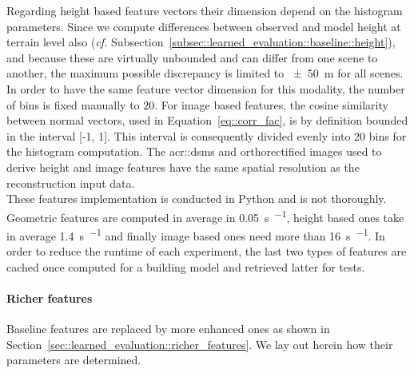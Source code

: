                 Regarding height based feature vectors their dimension depend on the histogram parameters.
                Since we compute differences between observed and model height at terrain level also (\textit{cf.} Subsection~\ref{subsec::learned_evaluation::baseline::height}), and because these are virtually unbounded and can differ from one scene to another, the maximum possible discrepancy is limited to \SI{\pm 50}{\m} for all scenes.
                In order to have the same feature vector dimension for this modality, the number of bins is fixed manually to \(20\).
                For image based features, the cosine similarity between normal vectors, used in Equation~\ref{eq::corr_fac}, is by definition bounded in the interval [-1, 1].
                This interval is consequently divided evenly into \(20\) bins for the histogram computation.
                The \glspl{acr::dsm} and orthorectified images used to derive height and image features have the same spatial resolution as the reconstruction input data.\\

                These features implementation is conducted in Python and is not thoroughly.
                Geometric features are computed in average in \SI{0.05}{\s \per \building}, height based ones take in average \SI{1.4}{\s \per \building} and finally image based ones need more than \SI{16}{\s \per \building}.
                In order to reduce the runtime of each experiment, the last two types of features are cached once computed for a building model and retrieved latter for tests.

            \paragraph{Richer features}
                Baseline features are replaced by more enhanced ones as shown in Section~\ref{sec::learned_evaluation::richer_features}.
                We lay out herein how their parameters are determined.

